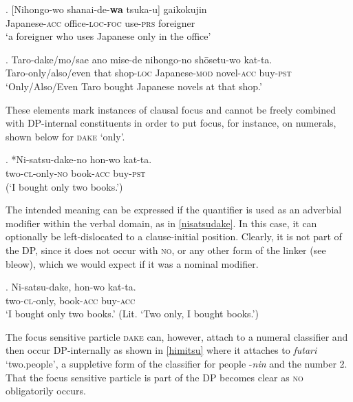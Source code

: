 \documentclass [output=book,colorlinks,citecolor=brown]{langscibook}
\begin{document}

\exg. [Nihongo-wo shanai-de-\textbf{wa} tsuka-u] gaikokujin\\
Japanese-\textsc{acc} office-\textsc{loc}-\textsc{foc} use-\textsc{prs} foreigner\\
`a foreigner who uses Japanese only in the office’ \\ \null \hfill \citep[93]{akaso:2011:on} \label{focuswa}

\newpage

\exg. Taro-dake/mo/sae ano mise-de nihongo-no shōsetu-wo kat-ta.\\
Taro-only/also/even that shop-\textsc{loc} Japanese-\textsc{mod} novel-\textsc{acc} buy-\textsc{pst}\\
`Only/Also/Even Taro bought Japanese novels at that shop.'  \\ \null \hfill \citep[195]{vermeulen:2012:info} \label{focusdake}

These elements mark instances of clausal focus and cannot be freely combined with DP-internal constituents in order to put focus, for instance, on numerals, shown below for \textsc{dake} `only’.

\exg. *Ni-satsu-dake-no hon-wo kat-ta. \label{futatsu}\\
two-\textsc{cl}-only-\textsc{no} book-\textsc{acc} buy-\textsc{pst}\\
(`I bought only two books.’)

The intended meaning can be expressed if the quantifier is used as an adverbial modifier within the verbal domain, as in \ref{nisatsudake}. In this case, it can optionally be left-dislocated to a clause-initial position. Clearly, it is not part of the DP, since it does not occur with \textsc{no}, or any other form of the linker (see bleow), which we would expect if it was a nominal modifier. %

\exg. Ni-satsu-dake, hon-wo kat-ta.\\
two-\textsc{cl}-only, book-\textsc{acc} buy-\textsc{acc}\\
`I bought only two books.’ (Lit. `Two only, I bought books.’) \label{nisatsudake}

The focus sensitive particle \textsc{dake} can, however, attach to a numeral classifier and then occur DP-internally as shown in \ref{himitsu} where it attaches to \textit{futari} `two.people’, a suppletive form of the classifier for people -\textit{nin} and the number 2. That the focus sensitive particle is part of the DP becomes clear as \textsc{no} obligatorily occurs. %
\end{document}
